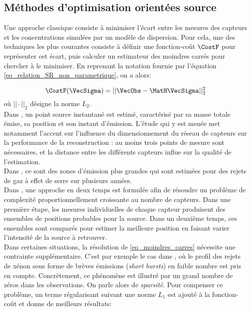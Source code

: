 
	\subsection{Méthodes d'optimisation orientées source}
	
	Une approche classique consiste à minimiser l'écart entre les mesures des capteurs et les concentrations simulées par un modèle de dispersion. Pour cela, une des techniques les plus courantes consiste à définir une fonction-coût $\CostF$ pour représenter cet écart, puis calculer un estimateur des moindres carrés pour chercher à le minimiser. En reprenant la notation fournie par l'équation \eqref{eq_relation_SR_non_parametrique}, on a alors:
	
	\begin{equation}
	\label{eq_moindres_carres}
	\CostF(\VecSigma) = || \VecObs - \MatH\VecSigma||_2^2
	\end{equation}
	où $||\cdot||_2$ désigne la norme $L_2$.\\
	
	Dans \cite{Kathirgamanathan2002}, un point source instantané est estimé, caractérisé par sa masse totale émise, sa position et son instant d'émission. L'étude qui y est menée met notamment l'accent sur l'influence du dimensionnement du réseau de capteurs sur la performance de la reconstruction : au moins trois points de mesure sont nécessaires, et la distance entre les différents capteurs influe sur la qualité de l'estimation.\\
	
	Dans \cite{Ryall2001}, ce sont des zones d'émission plus grandes qui sont estimées pour des rejets de gaz à effet de serre sur plusieurs années. \\
	
	Dans \cite{Matthes2005}, une approche en deux temps est formulée afin de résoudre un problème de complexité proportionnellement croissante au nombre de capteurs. Dans une première étape, les mesures individuelles de chaque capteur produisent des ensembles de positions probables pour la source. Dans un deuxième temps, ces ensembles sont comparés pour estimer la meilleure position en faisant varier l'intensité de la source à retrouver. \\
	
	Dans certaines situations, la résolution de \eqref{eq_moindres_carres} nécessite une contrainte supplémentaire. C'est par exemple le cas dans \cite{Martinez2013}, où le profil des rejets de xénon sous forme de brèves émissions (\textit{short bursts}) en faible nombre est pris en compte. Concrètement, ce phénomène est illustré par un grand nombre de zéros dans les observations. On parle alors de \textit{sparsité}. Pour compenser ce problème, un terme régularisant suivant une norme $L_1$ est ajouté à la fonction-coût et donne de meilleurs résultats:
	

